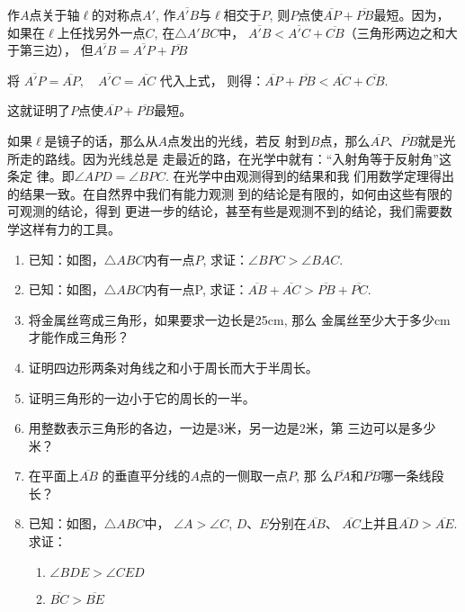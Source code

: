 \begin{solution}
    作$A$点关于轴$\ell$的对称点$A'$, 作$\overline{A'B}$与$\ell$相交于$P$, 
    则$P$点使$\overline{AP}+\overline{PB}$最短。因为，如果在$\ell$上任找另外一点$C$, 
    在$\triangle A'BC$中，
    $\overline{A'B}<\overline{A'C}+\overline{CB}$（三角形两边之和大于第三边），
    但$\overline{A'B}=\overline{A'P}+\overline{PB}$

将    $\overline{A'P}=\overline{AP},\quad \overline{A'C}=\overline{AC}$ 代入上式，
    则得：$\overline{AP}+\overline{PB}<\overline{AC}+\overline{CB}$.

    这就证明了$P$点使$\overline{AP}+\overline{PB}$最短。
\end{solution}

\begin{rmk}
    如果$\ell$是镜子的话，那么从$A$点发出的光线，若反
射到$B$点，那么$\overline{AP}$、$\overline{PB}$就是光所走的路线。因为光线总是
走最近的路，在光学中就有：“入射角等于反射角”这条定
律。即$\angle APD=\angle BPC$. 在光学中由观测得到的结果和我
们用数学定理得出的结果一致。在自然界中我们有能力观测
到的结论是有限的，如何由这些有限的可观测的结论，得到
更进一步的结论，甚至有些是观测不到的结论，我们需要数
学这样有力的工具。
\end{rmk}
    
\begin{ex}
\begin{enumerate}
    \item 已知：如图，$\triangle ABC$内有一点$P$, 
    求证：$\angle BPC>\angle BAC$.
    \item 已知：如图，$\triangle ABC$内有一点P,
    求证：$\overline{AB}+\overline{AC}>\overline{PB}+\overline{PC}$.
    \item 将金属丝弯成三角形，如果要求一边长是25cm, 那么
    金属丝至少大于多少cm才能作成三角形？
    \item 证明四边形两条对角线之和小于周长而大于半周长。
 \item 证明三角形的一边小于它的周长的一半。
 \item  用整数表示三角形的各边，一边是3米，另一边是2米，第
    三边可以是多少米？
\item  在平面上$\overline{AB}$
    的垂直平分线的$A$点的一侧取一点$P$, 那
    么$\overline{PA}$和$\overline{PB}$哪一条线段长？
\item 已知：如图，$\triangle ABC$中，
$\angle A>\angle C$, $D$、$E$分别在$\overline{AB}$、
    $\overline{AC}$上并且$\overline{AD}>\overline{AE}$.
    求证：
    \begin{enumerate}
        \item $\angle BDE> \angle CED$
        \item $\overline{BC}>\overline{BE}$
    \end{enumerate}
\end{enumerate}
\end{ex}
    
